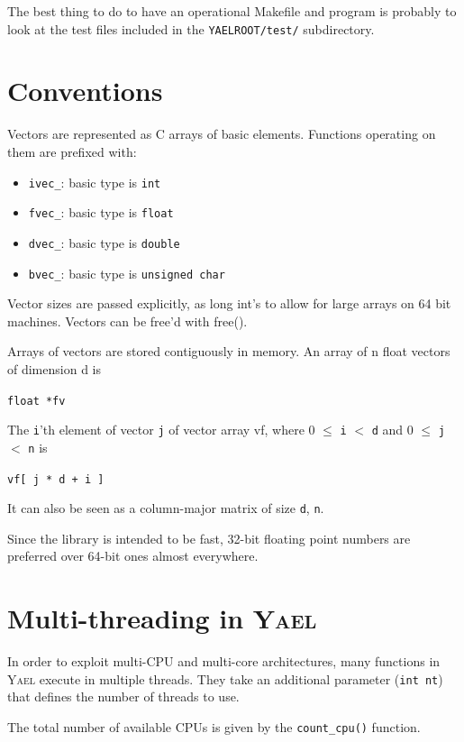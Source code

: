 \documentclass[a4paper,11pt,notitlepage,final,twoside]{report}
\newcommand{\yael}{\textsc{Yael}\xspace}
\newcommand{\yroot}{\texttt{YAELROOT}\xspace}
\newcommand{\tc}[1]{\texttt{#1}}
\begin{document}
The best thing to do to have an operational Makefile and program 
is probably to look at the test files included in the 
\tc{\yroot/test/} subdirectory. 
\bigskip


\section{Conventions}

Vectors are represented as C arrays of basic elements. Functions
operating on them are prefixed with:

\begin{itemize}
\item
   \tc{ivec\_}: basic type is \tc{int}

\item
   \tc{fvec\_}: basic type is \tc{float}

\item
   \tc{dvec\_}: basic type is \tc{double}

\item 
   \tc{bvec\_}: basic type is \tc{unsigned char}

\end{itemize}

Vector sizes are passed explicitly, as long int's to allow for
large arrays on 64 bit machines. Vectors can be free'd with free().


Arrays of vectors are stored contiguously in memory. An array of n
float vectors of dimension d is 

\tc{float *fv}

The \tc{i}'th element of vector \tc{j} of vector array vf, where 0 $\le$ \tc{i} $<$ \tc{d} and 
0 $\le$ \tc{j} $<$ \tc{n} is

 
\tc{vf[ j * d + i ]}

It can also be seen as a column-major matrix of size \tc{d}, \tc{n}.

Since the library is intended to be fast, 32-bit floating point numbers are preferred over 64-bit ones almost everywhere. 

\section{Multi-threading in \yael}

In order to exploit multi-CPU and multi-core architectures, many functions in \yael execute in multiple threads. They take an additional parameter (\tc{int nt}) that defines the number of threads to use. 

The total number of available CPUs is given by the \tc{count\_cpu()} function. 
\end{document}
